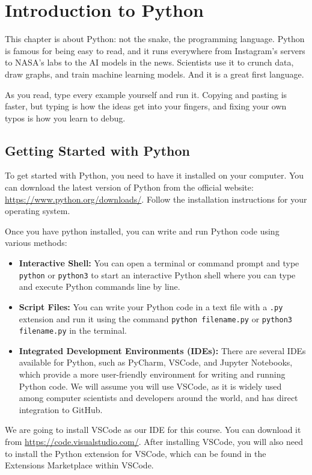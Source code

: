 \chapter{Introduction to Python}
This chapter is about Python: not the snake, the programming language. Python is famous for being easy to read, and it runs everywhere from Instagram's servers to NASA's labs to the AI models in the news. Scientists use it to crunch data, draw graphs, and train machine learning models. And it is a great first language.

As you read, type every example yourself and run it. Copying and pasting is faster, but typing is how the ideas get into your fingers, and fixing your own typos is how you learn to debug.

\section{Getting Started with Python}
To get started with Python, you need to have it installed on your computer. You can download the latest version of Python from the official website: \url{https://www.python.org/downloads/}. Follow the installation instructions for your operating system. %

Once you have python installed, you can write and run Python code using various methods:
\begin{itemize}
    \item \textbf{Interactive Shell:} You can open a terminal or command prompt and type \texttt{python} or \texttt{python3} to start an interactive Python shell where you can type and execute Python commands line by line.
    \item \textbf{Script Files:} You can write your Python code in a text file with a \texttt{.py} extension and run it using the command \texttt{python filename.py} or \texttt{python3 filename.py} in the terminal.
    \item \textbf{Integrated Development Environments (IDEs):} There are several IDEs available for Python, such as PyCharm, VSCode, and Jupyter Notebooks, which provide a more user-friendly environment for writing and running Python code. We will assume you will use VSCode, as it is widely used among computer scientists and developers around the world, and has direct integration to GitHub. 
\end{itemize}

We are going to install VSCode as our IDE for this course. You can download it from \url{https://code.visualstudio.com/}. After installing VSCode, you will also need to install the Python extension for VSCode, which can be found in the Extensions Marketplace within VSCode.
